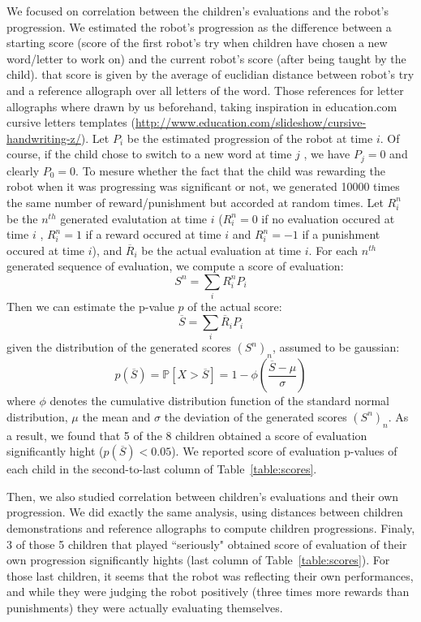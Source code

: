 \documentclass{sig-alternate}
\begin{document}
We focused on correlation between the children's evaluations and the robot's progression.
We estimated the robot's progression as the difference between a starting score
(score of the first robot's try when children have chosen a new word/letter to
work on) and the current robot's score (after being taught by the child). that
score is given by the average of euclidian
distance between robot's try and a reference allograph over all letters of the
word. Those references for letter allographs where drawn by
us beforehand, taking inspiration in education.com cursive letters templates
(\url{http://www.education.com/slideshow/cursive-handwriting-z/}). Let $P_i$ be the
estimated progression of the robot at time $ i$. Of course, if the child
chose to switch to a new word at time $ j$ , we have $ P_{j}=0$ and clearly $
P_0=0$.
To mesure whether the fact that the child was rewarding the robot when it was
progressing was significant or not, we generated 10000 times the same number of reward/punishment
but accorded at random times. Let $ R_i^n$ be the $n^{th}$ generated evalutation at
time $ i$ ($ R_i^n = 0$ if
no evaluation occured at time $ i$ , $ R_i^n=1$ if a reward occured at time
$i$ and $R_i^n=-1$ if a punishment occured at time $i$), and $\overline{R}_i$ be the
actual evaluation at time $i$. For each $n^{th}$ generated sequence of evaluation, we
compute a score of evaluation: $$ S^n = \sum\limits_i{R_i^n P_i}$$ 
Then we can estimate the p-value $p$ of the actual score: $$ \overline{S} =
\sum\limits_i{\overline{R}_i P_i}$$ 
given the distribution of the generated scores $\left(S^n\right)_n$, assumed to
be gaussian: 
$$p(\overline{S})= \mathbb{P}{\left[X>\overline{S}\right]} = 1-\phi{\left(\frac{\overline{S}-\mu}{\sigma}\right)}$$
where $\phi$ denotes the cumulative distribution function of the standard normal
distribution, $\mu$ the mean and $\sigma$ the deviation of the generated 
scores $\left(S^n\right)_n$. 
As a result, we found that 5 of the 8 children obtained a score of evaluation
significantly hight ($p(\overline{S})<0.05$). We reported score of evaluation
p-values of each child in the second-to-last column of Table~\ref{table:scores}.

Then, we also studied correlation between children's evaluations and their own
progression. We did exactly the same analysis, using distances between children
demonstrations and reference allographs to compute children progressions.
Finaly, 3 of those 5 children that played ``seriously" obtained score of evaluation of their own
progression significantly hights (last column of Table~\ref{table:scores}). For
those last children, it seems that the robot was reflecting their own performances, and while they
were judging the robot positively (three times more rewards than punishments)
they were actually evaluating themselves.
\end{document}
